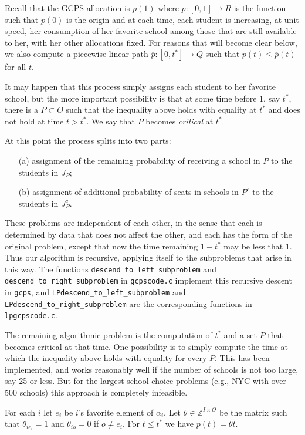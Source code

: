 \documentclass[12pt]{article}
\theoremstyle{definition}
\newcommand{\In}{\mathbb{Z}}
\newcommand{\barp}{\overline{p}}
\begin{document}
\begin{appendix}
Recall that the GCPS allocation is $p(1)$ where $p \colon [0,1] \to R$
is the function such that $p(0)$ is the origin and at each time, each
student is increasing, at unit speed, her consumption of her favorite
school among those that are still available to her, with her other
allocations fixed.  For reasons that will become clear below, we also
compute a piecewise linear path $\barp \colon [0,t^*] \to Q$ such that
$p(t) \le \barp(t)$ for all $t$.

It may happen that this process simply assigns each student to her
favorite school, but the more important possibility is that at some
time before $1$, say $t^*$, there is a $P \subset O$ such that the
inequality above holds with equality at $t^*$ and does not hold at
time $t > t^*$.  We say that $P$ becomes \emph{critical} at $t^*$.

At this point the process splits into two parts:
\begin{enumerate}
  \item[(a)] assignment of the remaining probability of receiving a
    school in $P$ to the students in $J_P$;
  \item[(b)] assignment of additional probability of seats in schools
    in $P^c$ to the students in $J_P^c$.
\end{enumerate}
These problems are independent of each other, in the sense that each
is determined by data that does not affect the other, and each has the
form of the original problem, except that now the time remaining $1 -
t^*$ may be less that $1$.  Thus our algorithm is recursive, applying
itself to the subproblems that arise in this way.  The functions
\texttt{descend\_to\_left\_subproblem} and
\texttt{descend\_to\_right\_subproblem} in \texttt{gcpscode.c}
implement this recursive descent in \texttt{gcps}, and
\texttt{LPdescend\_to\_left\_subproblem} and
\texttt{LPdescend\_to\_right\_subproblem}  are the
corresponding functions in \texttt{lpgcpscode.c}.

The remaining algorithmic problem is the computation of $t^*$ and a
set $P$ that becomes critical at that time.  One possibility is to
simply compute the time at which the inequality above holds with
equality for every $P$.  This has been implemented, and works
reasonably well if the number of schools is not too large, say 25 or
less.  But for the largest school choice problems (e.g., NYC with over
500 schools) this approach is completely infeasible.

For each $i$ let $e_i$ be $i$'s favorite
element of $\alpha_i$.  Let $\theta \in \In^{I \times O}$ be the
matrix such that $\theta_{ie_i} = 1$ and $\theta_{io} = 0$ if $o \ne
e_i$.  For $t \le t^*$ we have $p(t) = \theta t$.


\end{appendix}
\end{document}
